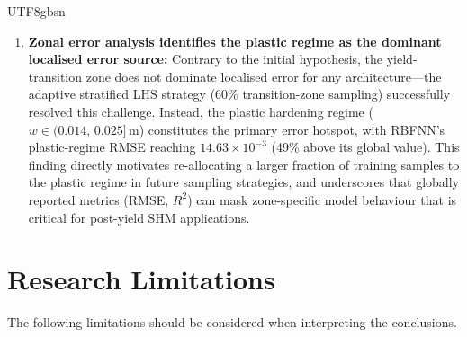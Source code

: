 \documentclass[a4paper,12pt]{report}
\begin{document}
\begin{CJK}{UTF8}{gbsn}
\begin{enumerate}
  \item \textbf{Zonal error analysis identifies the plastic regime as the dominant
    localised error source:} Contrary to the initial hypothesis, the yield-transition
    zone does not dominate localised error for any architecture---the adaptive stratified
    LHS strategy (60\% transition-zone sampling) successfully resolved this challenge.
    Instead, the plastic hardening regime ($w \in (0.014,\,0.025]$\,m) constitutes the
    primary error hotspot, with RBFNN's plastic-regime RMSE reaching $14.63\times10^{-3}$
    (49\% above its global value). This finding directly motivates re-allocating a larger
    fraction of training samples to the plastic regime in future sampling strategies,
    and underscores that globally reported metrics (RMSE, $R^2$) can mask zone-specific
    model behaviour that is critical for post-yield SHM applications.
\end{enumerate}

\section{Research Limitations}
\label{sec:limitations}

The following limitations should be considered when interpreting the conclusions.


\end{CJK}
\end{document}
